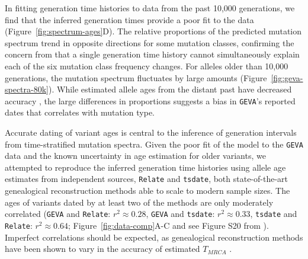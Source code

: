 \documentclass[]{article}
\newcommand{\GEVA}{\texttt{GEVA}\xspace}
\newcommand{\tsdate}{\texttt{tsdate}\xspace}
\newcommand{\relate}{\texttt{Relate}\xspace}
\begin{document}
In fitting generation time histories to data from the past 10,000 generations,
we find that the inferred generation times provide a poor fit to the data
(Figure~\ref{fig:spectrum-ages}D). The relative proportions of the predicted
mutation spectrum trend in opposite directions for some mutation classes,
confirming the concern from \citet{gao2022limited} that a single generation
time history cannot simultaneously explain each of the six mutation class
frequency changes. For alleles older than 10,000 generations, the mutation
spectrum fluctuates by large amounts (Figure~\ref{fig:geva-spectra-80k}). While
estimated allele ages from the distant past have decreased accuracy
\citep{albers2020dating,wang2023human}, the large differences in proportions
suggests a bias in \GEVA's reported dates that correlates with mutation type.

Accurate dating of variant ages is central to the inference of generation
intervals from time-stratified mutation spectra.
Given the poor fit of the model to the \GEVA data and the known uncertainty in
age estimation for older variants, we attempted to reproduce the inferred
generation time histories using allele age estimates from independent sources,
\relate \citep{speidel2019method} and \tsdate \citep{wohns2022unified}, both
state-of-the-art genealogical reconstruction methods able to scale to modern sample sizes. 
The ages of variants
dated by at least two of the methods are only moderately correlated (\GEVA and
\relate: $r^2 \approx 0.28$, \GEVA and \tsdate: $r^2 \approx 0.33$, \tsdate
and \relate: $r^2 \approx 0.64$; Figure~\ref{fig:data-comp}A-C and see Figure
S20 from \citet{wohns2022unified}). Imperfect correlations should be expected,
as genealogical reconstruction methods have been shown to vary in the accuracy
of estimated $T_{MRCA}$ \citep{brandt2022evaluation}.
\end{document}
